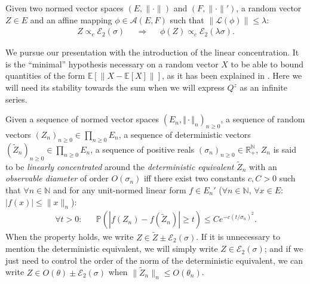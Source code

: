 \documentclass{ws-rmta}
\begin{document}
\begin{proposition}\label{pro:stabilite_concentration_convexe_affine}
  Given two normed vector spaces $(E,\|\cdot\|)$ and $(F,\|\cdot\|')$, a random vector $Z \in E$ and an affine mapping $\phi \in \mathcal A(E,F)$ such that $\|\mathcal L(\phi)\|\leq \lambda$:
  \begin{align*}
    Z \propto_c \mathcal E_2(\sigma)&
    &\Longrightarrow&
    &\phi(Z) \propto_c \mathcal E_2(\lambda\sigma).
  \end{align*}
\end{proposition}

We pursue our presentation with the introduction of the linear concentration. It is the ``minimal'' hypothesis necessary on a random vector $X$ to be able to bound quantities of the form $\mathbb E[\|X - \mathbb E[X]\|]$, as it has been explained in \cite{LOU19}. Here we will need its stability towards the sum when we will express $Q^z$ as an infinite series.
\begin{definition}\label{def:linear_concentration}
  Given a sequence of normed vector spaces $(E_n, \Vert \cdot \Vert_n)_{n\geq 0}$, a sequence of random vectors $(Z_n)_{n\geq 0} \in \prod_{n\geq 0} E_n$, a sequence of deterministic vectors $(\tilde Z_n)_{n\geq 0} \in \prod_{n\geq 0} E_n$, a sequence of positive reals $(\sigma_n)_{n\geq 0} \in \mathbb R_+ ^{\mathbb N}$, $Z_n$ is said to be \emph{linearly concentrated} around the \emph{deterministic equivalent} 
  $\tilde Z_n$ with an \emph{observable diameter} of order $O(\sigma_n)$ iff there exist two constants $c,C >0$ such that $\forall n \in \mathbb N$ and for any unit-normed linear form $f \in E_n'$ ($\forall n \in \mathbb N$, $\forall x \in E$: $|f(x)| \leq \|x\|_n$):
  \begin{align*}
    \forall t>0:& 
      &\mathbb P \left(\left\vert f(Z_n ) - f(\tilde Z_n)\right\vert\geq t\right) \leq C e^{-c(t/\sigma_n)^2}.
  \end{align*}
  When the property holds, we write $Z \in \tilde Z \pm \mathcal E_2(\sigma)$. 
  If it is unnecessary to mention the deterministic equivalent, we will simply write $Z \in \mathcal E_2(\sigma)$; and if we just need to control the order of the norm of the deterministic equivalent, we can write $Z \in O(\theta)\pm \mathcal E_2(\sigma)$ when $\|\tilde Z_n \|_n \leq O(\theta_n)$.
\end{definition}
\end{document}
